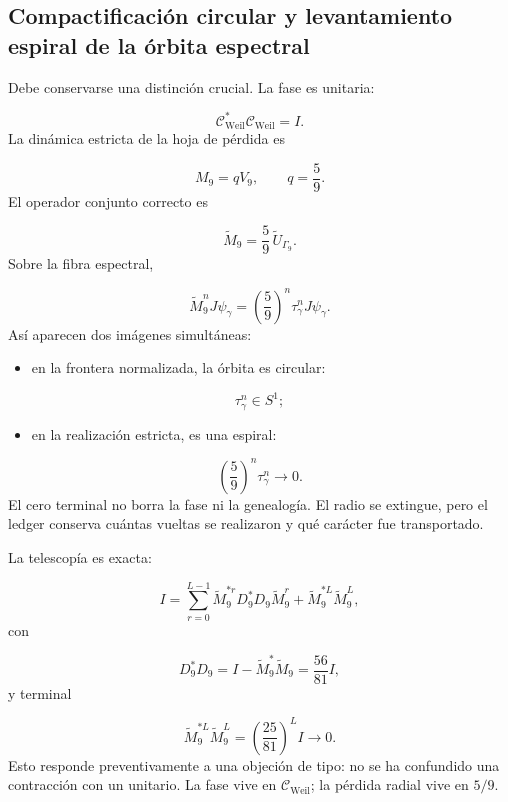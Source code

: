 \subsection{Compactificación circular y levantamiento espiral de la órbita espectral}
Debe conservarse una distinción crucial. La fase es unitaria:\par
\[
\mathcal C_{\mathrm{Weil}}^*
\mathcal C_{\mathrm{Weil}}=I.
\]
La dinámica estricta de la hoja de pérdida es\par
\[
M_9=qV_9,
\qquad
q=\frac59.
\]
El operador conjunto correcto es\par
\[
\widetilde M_9
=
\frac59\,\widetilde U_{\Gamma_9}.
\]
Sobre la fibra espectral,\par
\[
\widetilde M_9^nJ\psi_\gamma
=
\left(\frac59\right)^n
\tau_\gamma^n
J\psi_\gamma.
\]
Así aparecen dos imágenes simultáneas:\par
\begin{itemize}
\item en la frontera normalizada, la órbita es circular:
\end{itemize}
  \[
  \tau_\gamma^n\in S^1;
  \]
\begin{itemize}
\item en la realización estricta, es una espiral:
\end{itemize}
  \[
  \left(\frac59\right)^n\tau_\gamma^n\longrightarrow0.
  \]
El cero terminal no borra la fase ni la genealogía. El radio se extingue, pero el ledger conserva cuántas vueltas se realizaron y qué carácter fue transportado.\par
La telescopía es exacta:\par
\[
I
=
\sum_{r=0}^{L-1}
\widetilde M_9^{*r}
D_9^*D_9
\widetilde M_9^r
+
\widetilde M_9^{*L}\widetilde M_9^L,
\]
con\par
\[
D_9^*D_9
=
I-\widetilde M_9^*\widetilde M_9
=
\frac{56}{81}I,
\]
y terminal\par
\[
\widetilde M_9^{*L}\widetilde M_9^L
=
\left(\frac{25}{81}\right)^LI
\longrightarrow0.
\]
Esto responde preventivamente a una objeción de tipo: no se ha confundido una contracción con un unitario. La fase vive en \(\mathcal C_{\mathrm{Weil}}\); la pérdida radial vive en \(5/9\).\par
{}
